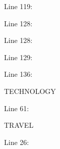 Line 119:



Line 128:


Line 128:


Line 129:


Line 136:


TECHNOLOGY

Line 61:


TRAVEL

Line 26:



